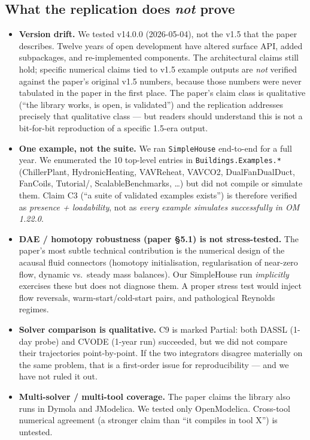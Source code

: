 \documentclass[11pt]{article}
\begin{document}
\subsection{What the replication does \emph{not} prove}
\begin{itemize}
  \item \textbf{Version drift.} We tested v14.0.0 (2026-05-04),
        not the v1.5 that the paper describes. Twelve years of open
        development have altered surface API, added subpackages,
        and re-implemented components. The architectural claims still
        hold; specific numerical claims tied to v1.5 example outputs are
        \emph{not} verified against the paper's original v1.5 numbers,
        because those numbers were never tabulated in the paper in the
        first place. The paper's claim class is qualitative
        (``the library works, is open, is validated'') and the replication
        addresses precisely that qualitative class --- but readers should
        understand this is not a bit-for-bit reproduction of a specific
        1.5-era output.
  \item \textbf{One example, not the suite.} We ran \texttt{SimpleHouse}
        end-to-end for a full year. We enumerated the 10 top-level
        entries in \texttt{Buildings.Examples.*} (ChillerPlant,
        HydronicHeating, VAVReheat, VAVCO2, DualFanDualDuct, FanCoils,
        Tutorial/, ScalableBenchmarks, \ldots) but did not compile or
        simulate them. Claim C3 (``a suite of validated examples exists'')
        is therefore verified as \emph{presence + loadability}, not as
        \emph{every example simulates successfully in OM 1.22.0}.
  \item \textbf{DAE / homotopy robustness (paper \S5.1) is not stress-tested.}
        The paper's most subtle technical contribution is the numerical
        design of the acausal fluid connectors (homotopy initialisation,
        regularisation of near-zero flow, dynamic vs.\ steady mass balances).
        Our SimpleHouse run \emph{implicitly} exercises these but does
        not diagnose them. A proper stress test would inject flow
        reversals, warm-start/cold-start pairs, and pathological
        Reynolds regimes.
  \item \textbf{Solver comparison is qualitative.} C9 is marked Partial:
        both DASSL (1-day probe) and CVODE (1-year run) succeeded, but
        we did not compare their trajectories point-by-point. If the two
        integrators disagree materially on the same problem, that is a
        first-order issue for reproducibility --- and we have not ruled it out.
  \item \textbf{Multi-solver / multi-tool coverage.} The paper claims
        the library also runs in Dymola and JModelica. We tested only
        OpenModelica. Cross-tool numerical agreement (a stronger claim
        than ``it compiles in tool X'') is untested.
\end{itemize}
\end{document}
